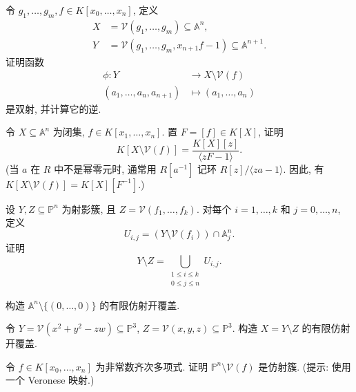 \BookExerciseHeading
\begin{BookExercises}
  \item\label{ex:graph-of-inverse-polynomial-projection-is-bijective} 令 $g_{1},\ldots,g_{m},f\in K[x_{0},\ldots,x_{n}]$, 定义
  \[
    \begin{aligned}
    X&=\mathcal{V}(g_{1},\ldots,g_{m})\subseteq\mathbb{A}^{n},\\
    Y&=\mathcal{V}(g_{1},\ldots,g_{m},x_{n+1}f-1)\subseteq\mathbb{A}^{n+1}.
    \end{aligned}
  \]
  证明函数
  \[
    \begin{aligned}
      \phi:Y&\to X\setminus\mathcal{V}(f)\\
      (a_{1},\ldots,a_{n},a_{n+1})&\mapsto(a_{1},\ldots,a_{n})
    \end{aligned}
  \]
  是双射, 并计算它的逆.
  \item\label{ex:regular-function-ring-of-principal-open-is-localization} 令 $X\subseteq\mathbb{A}^{n}$ 为闭集, $f\in K[x_{1},\ldots,x_{n}]$. 置 $F=[f]\in K[X]$, 证明
  \[
    K[X\setminus\mathcal{V}(f)]=\frac{K[X][z]}{\langle zF-1\rangle}.
  \]
  (当 $a$ 在 $R$ 中不是幂零元时, 通常用 $R[a^{-1}]$ 记环 $R[z]/\langle za-1\rangle$. 因此, 有 $K[X\setminus\mathcal{V}(f)]=K[X][F^{-1}]$.)
  \item\label{ex:finite-affine-open-cover-from-defining-equations} 设 $Y,Z\subseteq\mathbb{P}^{n}$ 为射影簇, 且 $Z=\mathcal{V}(f_{1},\ldots,f_{k})$. 对每个 $i=1,\ldots,k$ 和 $j=0,\ldots,n$, 定义
  \[
    U_{i,j}=(Y\setminus\mathcal{V}(f_{i}))\cap\mathbb{A}^{n}_{j}.
  \]
  证明
  \[
    Y\setminus Z=\bigcup_{\substack{1\le i\le k\\0\le j\le n}}U_{i,j}.
  \]
  \item\label{ex:affine-open-cover-of-punctured-affine-space} 构造 $\mathbb{A}^{n}\setminus\{(0,\ldots,0)\}$ 的有限仿射开覆盖.
  \item\label{ex:affine-open-cover-of-open-projective-quadric} 令 $Y=\mathcal{V}(x^{2}+y^{2}-zw)\subseteq\mathbb{P}^{3}$, $Z=\mathcal{V}(x,y,z)\subseteq\mathbb{P}^{3}$. 构造 $X=Y\setminus Z$ 的有限仿射开覆盖.
  \item\label{ex:projective-hypersurface-complement-is-affine} 令 $f\in K[x_{0},\ldots,x_{n}]$ 为非常数齐次多项式. 证明 $\mathbb{P}^{n}\setminus\mathcal{V}(f)$ 是仿射簇. (提示: 使用一个 Veronese 映射.)
\end{BookExercises}
